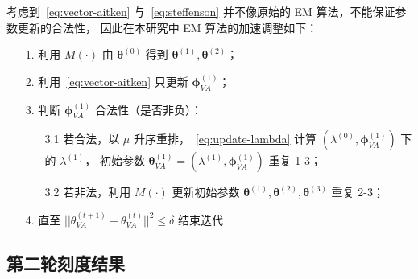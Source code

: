 考虑到~\eqref{eq:vector-aitken} 与~\eqref{eq:steffenson} 并不像原始的 EM 算法，不能保证参数更新的合法性，
因此在本研究中 EM 算法的加速调整如下：
\begin{enumerate}
    \item[1.] 利用 $M(\cdot)$ 由 $\boldsymbol{\theta}^{(0)}$ 得到 $\boldsymbol{\theta}^{(1)}, \boldsymbol{\theta}^{(2)}$；
    \item[2.] 利用~\eqref{eq:vector-aitken} 只更新 $\boldsymbol{\phi}_{VA}^{(1)}$；
    \item[3.] 判断 $\boldsymbol{\phi}_{VA}^{(1)}$ 合法性（是否非负）：
    \begin{enumerate}
        \item[3.1 ] 若合法，以 $\mu$ 升序重排，~\eqref{eq:update-lambda} 计算 $(\lambda^{(0)}, \boldsymbol{\phi}_{VA}^{(1)})$ 下的 $\lambda^{(1)}$，
        初始参数 $\boldsymbol{\theta}_{VA}^{(1)}=(\lambda^{(1)}, \boldsymbol{\phi}_{VA}^{(1)})$ 重复 1-3；
        \item[3.2 ] 若非法，利用 $M(\cdot)$ 更新初始参数 $\boldsymbol{\theta}^{(1)},\boldsymbol{\theta}^{(2)}, \boldsymbol{\theta}^{(3)}$ 重复 2-3；
    \end{enumerate}
    \item[4.] 直至 $||\theta_{VA}^{(t+1)}-\theta_{VA}^{(t)}||^2\leq\delta$ 结束迭代
\end{enumerate}

\subsection{第二轮刻度结果}
